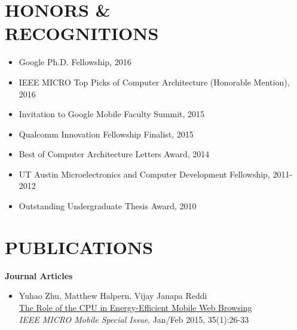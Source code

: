 \documentclass[margin, 9pt]{res} %
\begin{document}
\begin{resume}
 
\section{HONORS \&\\ RECOGNITIONS}

\vspace*{-1pt}
\begin{itemize}[leftmargin=*] \itemsep -4pt
        \item Google Ph.D. Fellowship, 2016
	\item IEEE MICRO Top Picks of Computer Architecture (Honorable Mention), 2016
	\item Invitation to Google Mobile Faculty Summit, 2015
	\item Qualcomm Innovation Fellowship Finalist, 2015
	\item Best of Computer Architecture Letters Award, 2014
	\item UT Austin Microelectronics and Computer Development Fellowship, 2011-2012
	\item Outstanding Undergraduate Thesis Award, 2010
\end{itemize}

 
\section{PUBLICATIONS}

{\large\textbf{Journal Articles}}

\begin{itemize}[leftmargin=*] \itemsep 0pt
	\item Yuhao Zhu, Matthew Halpern, Vijay Janapa Reddi\\[2pt]
          \href{http://yuhaozhu.com/pubs/ieeemicro15.pdf}{The Role of the CPU in Energy-Efficient Mobile Web Browsing}\\
          \textit{IEEE MICRO Mobile Special Issue}, Jan/Feb 2015, 35(1):26-33


\end{itemize}
\end{resume}
\end{document}
